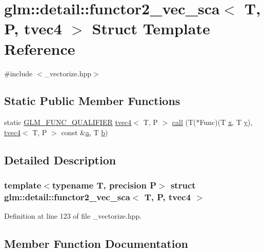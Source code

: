 \hypertarget{structglm_1_1detail_1_1functor2__vec__sca_3_01_t_00_01_p_00_01tvec4_01_4}{}\section{glm\+::detail\+::functor2\+\_\+vec\+\_\+sca$<$ T, P, tvec4 $>$ Struct Template Reference}
\label{structglm_1_1detail_1_1functor2__vec__sca_3_01_t_00_01_p_00_01tvec4_01_4}


{\ttfamily \#include $<$\+\_\+vectorize.\+hpp$>$}

\subsection*{Static Public Member Functions}
\begin{DoxyCompactItemize}
\item 
static \mbox{\hyperlink{setup_8hpp_a33fdea6f91c5f834105f7415e2a64407}{G\+L\+M\+\_\+\+F\+U\+N\+C\+\_\+\+Q\+U\+A\+L\+I\+F\+I\+ER}} \mbox{\hyperlink{structglm_1_1tvec4}{tvec4}}$<$ T, P $>$ \mbox{\hyperlink{structglm_1_1detail_1_1functor2__vec__sca_3_01_t_00_01_p_00_01tvec4_01_4_ac8dcfe692f5b5d07ca805f981d58a913}{call}} (T($\ast$Func)(T \mbox{\hyperlink{glad_8h_a92d0386e5c19fb81ea88c9f99644ab1d}{x}}, T \mbox{\hyperlink{glad_8h_a66ddd433d2cacfe27f5906b7e86faeed}{y}}), \mbox{\hyperlink{structglm_1_1tvec4}{tvec4}}$<$ T, P $>$ const \&\mbox{\hyperlink{glad_8h_ac8729153468b5dcf13f971b21d84d4e5}{a}}, T \mbox{\hyperlink{glad_8h_a6eba317e3cf44d6d26c04a5a8f197dcb}{b}})
\end{DoxyCompactItemize}


\subsection{Detailed Description}
\subsubsection*{template$<$typename T, precision P$>$\newline
struct glm\+::detail\+::functor2\+\_\+vec\+\_\+sca$<$ T, P, tvec4 $>$}



Definition at line 123 of file \+\_\+vectorize.\+hpp.



\subsection{Member Function Documentation}
\mbox{\label{structglm_1_1detail_1_1functor2__vec__sca_3_01_t_00_01_p_00_01tvec4_01_4_ac8dcfe692f5b5d07ca805f981d58a913}} 
